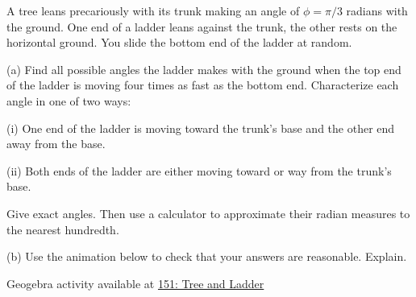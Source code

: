 \documentclass{ximera}
\begin{document}
\begin{question}  \label{QMMnd6793}
A tree leans precariously with its trunk making an angle of $\phi = \pi/3$ radians with the ground. One end of a ladder leans against the trunk, the other rests on the horizontal ground. You slide the bottom end of the ladder at random.

(a) Find all possible angles the ladder makes with the ground when the top end of the ladder is moving four times as fast as the bottom end. Characterize each angle in one of two ways:

(i) One end of the ladder is moving toward the trunk's base and the other end away from the base.

(ii) Both ends of the ladder are either moving toward or way from the trunk's base.

Give exact angles. Then use a calculator to approximate their radian measures to the nearest hundredth.

(b) Use the animation below to check that your answers are reasonable. Explain.


\begin{onlineOnly}
    \begin{center}
\end{center}
\end{onlineOnly}

Geogebra activity available at \href{https://www.desmos.com/calculator/5uo8nowbr6}{151: Tree and Ladder}

\end{question}
\end{document}

